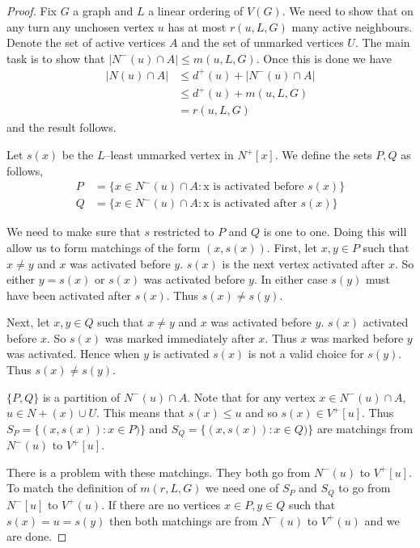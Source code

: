 \begin{proof}
    Fix $G$ a graph and $L$ a linear ordering of $V(G)$. We need to show that on any turn any unchosen vertex $u$ has at most $r(u,L,G)$ many active neighbours. Denote the set of active vertices $A$ and the set of unmarked vertices $U$. The main task is to show that $|N^-(u)\cap A|\leq m(u,L,G)$. Once this is done we have 
    \begin{align*}
        |N(u)\cap A| &\leq d^+(u) + |N^-(u)\cap A| \\
        & \leq  d^+(u) + m(u,L,G) \\
        & = r(u,L,G)
    \end{align*} 
    and the result follows.
    
    Let $s(x)$ be the $L$--least unmarked vertex in $N^+[x]$. We define the sets $P,Q$ as follows,
    \begin{align*}
        P&=\{x\in N^-(u)\cap A : \text{x is activated before $s(x)$}\} \\        
        Q&=\{x\in N^-(u)\cap A : \text{x is activated after $s(x)$}\}
    \end{align*}
    
    We need to make sure that $s$ restricted to $P$ and $Q$ is one to one. Doing this will allow us to form matchings of the form $(x,s(x))$. First, let $x,y\in P$ such that $x\neq y$ and $x$ was activated before $y$. $s(x)$ is the next vertex activated after $x$. So either $y = s(x)$ or $s(x)$ was activated before $y$. In either case $s(y)$ must have been activated after $s(x)$. Thus $s(x)\neq s(y)$.
    
    Next, let $x,y\in Q$ such that $x\neq y$ and $x$ was activated before $y$. $s(x)$ activated before $x$. So $s(x)$ was marked immediately after $x$. Thus $x$ was marked before $y$ was activated. Hence when $y$ is activated $s(x)$ is not a valid choice for $s(y)$. Thus $s(x)\neq s(y)$.
    
    $\{P,Q\}$ is a partition of $N^-(u)\cap A$. Note that for any vertex $x\in N^-(u)\cap A$, $u\in N+(x)\cup U$. This means that $s(x)\leq u$ and so $s(x)\in V^+[u]$. Thus $S_P = \{(x,s(x)):x\in P)\}$ and $S_Q = \{(x,s(x)):x\in Q)\}$ are matchings from $N^-(u)$ to $V^+[u]$.
    
    There is a problem with these matchings. They both go from $N^-(u)$ to $V^+[u]$. To match the definition of $m(r,L,G)$ we need one of $S_P$ and $S_Q$ to go from $N^-[u]$ to $V^+(u)$. If there are no vertices $x\in P, y\in Q$ such that $s(x)=u=s(y)$ then both matchings are from $N^-(u)$ to $V^+(u)$ and we are done. 
    

\end{proof}
